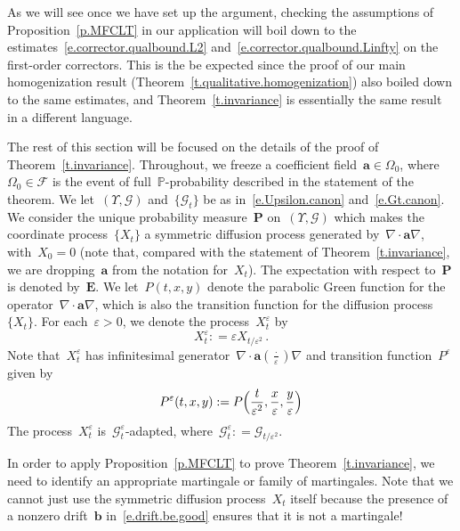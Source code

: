 \documentclass[11pt,twoside]{article} %
\numberwithin{equation}{section}
\theoremstyle{definition}
\newcommand{\eps}{\varepsilon}
\renewcommand{\b}{\ensuremath{\mathbf{b}}}
\newcommand{\ep}{\eps}
\renewcommand{\a}{\mathbf{a}}
\newcommand{\F}{\mathcal{F}}
\renewcommand{\P}{\mathbb{P}}
\begin{document}
\smallskip

As we will see once we have set up the argument, checking the assumptions of Proposition~\ref{p.MFCLT} in our application will boil down to the estimates~\eqref{e.corrector.qualbound.L2} and~\eqref{e.corrector.qualbound.Linfty} on the first-order correctors.  This is the be expected since the proof of our main homogenization result (Theorem~\ref{t.qualitative.homogenization}) also boiled down to the same estimates, and Theorem~\ref{t.invariance} is essentially the same result in a different language. 

\smallskip

The rest of this section will be focused on the details of the proof of Theorem~\ref{t.invariance}. Throughout, we freeze a coefficient field~$\a \in \Omega_0$, where~$\Omega_0 \in\F$ is the event of full~$\P$-probability described in the statement of the theorem. 
We let~$(\Upsilon,\mathcal{G})$  and~$\{ \mathcal{G}_t \}$ be as in~\eqref{e.Upsilon.canon} and~\eqref{e.Gt.canon}.
We consider the unique probability measure~$\mathbf{P}$ on~$(\Upsilon,\mathcal{G})$ which makes the coordinate process~$\{ X_t\}$ a symmetric diffusion process generated by~$\nabla \cdot \a\nabla$, with~$X_0=0$ (note that, compared with the statement of Theorem~\ref{t.invariance}, we are dropping~$\a$ from the notation for~$X_t$). The expectation with respect to~$\mathbf{P}$ is denoted by~$\mathbf{E}$.
We let~$P(t,x,y)$ denote the parabolic Green function for the operator~$\nabla \cdot \a\nabla$, which is also the transition function for the diffusion process~$\{ X_t\}$.
For each~$\ep>0$, we denote the process~$X_t^\ep$ by
\begin{equation*}
X_t^\ep : = \ep  X_{  t/{\ep^2} }\,.
\end{equation*}
Note that~$X_t^\ep$ has infinitesimal generator~$\nabla \cdot \a(\frac\cdot\ep)\nabla$ and transition function~$P^\ep$ given by
\begin{equation}
\label{e.Pep}
P^\ep(t,x,y) 
:=
P \Bigl ( \frac{t}{ \ep^2} ,  \frac{ x} { \ep} ,  \frac{y} {\ep} \Bigr)
\end{equation}
The process~$X_t^\ep$ is~$\mathcal{G}_{t}^\ep$-adapted, where~$\mathcal{G}_{t}^\ep: = \mathcal{G}_{t/\ep^2}$. 

\smallskip


\smallskip

In order to apply Proposition~\ref{p.MFCLT} to prove Theorem~\ref{t.invariance}, we need to identify an appropriate martingale or family of martingales.
Note that we cannot just use the symmetric diffusion process~$X_t$ itself because the presence of a nonzero drift~$\b$ in~\eqref{e.drift.be.good} ensures that it is not a martingale! 
\end{document}
